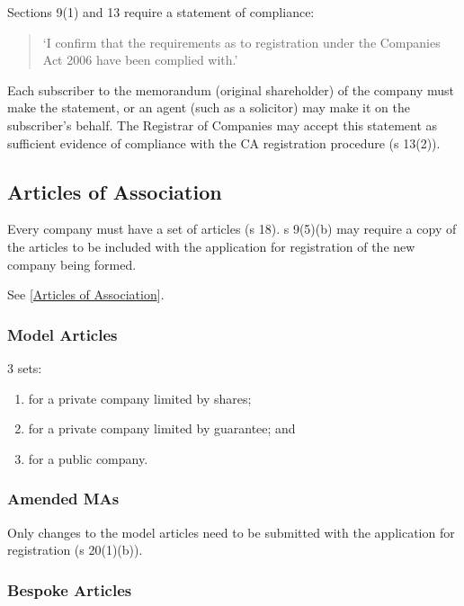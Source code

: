 \documentclass[
]{article}
\providecommand{\tightlist}{%
  \setlength{\itemsep}{0pt}\setlength{\parskip}{0pt}}
\begin{document}
Sections 9(1) and 13 require a statement of compliance:

\begin{quote}
`I confirm that the requirements as to registration under the Companies
Act 2006 have been complied with.'
\end{quote}

Each subscriber to the memorandum (original shareholder) of the company
must make the statement, or an agent (such as a solicitor) may make it
on the subscriber's behalf. The Registrar of Companies may accept this
statement as sufficient evidence of compliance with the CA registration
procedure (s 13(2)).

\hypertarget{articles-of-association-1}{%
\subsection{Articles of Association}\label{articles-of-association-1}}

Every company must have a set of articles (s 18). s 9(5)(b) may require
a copy of the articles to be included with the application for
registration of the new company being formed.

See {[}\protect\hyperlink{articles-of-association-1}{Articles of
Association}{]}.

\hypertarget{model-articles}{%
\subsubsection{Model Articles}\label{model-articles}}

3 sets:

\begin{enumerate}
\def\labelenumi{\arabic{enumi}.}
\tightlist
\item
  for a private company limited by shares;
\item
  for a private company limited by guarantee; and
\item
  for a public company.
\end{enumerate}

\hypertarget{amended-mas}{%
\subsubsection{Amended MAs}\label{amended-mas}}

Only changes to the model articles need to be submitted with the
application for registration (s 20(1)(b)).

\hypertarget{bespoke-articles}{%
\subsubsection{Bespoke Articles}\label{bespoke-articles}}
\end{document}
